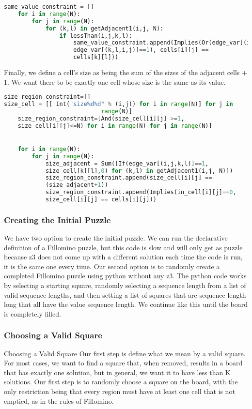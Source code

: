 \begin{lstlisting}[language=python]
  same_value_constraint = []
    for i in range(N):
        for j in range(N):
            for (k,l) in getAdjacent1(i,j, N):
                if lessThan(i,j,k,l):
                    same_value_constraint.append(Implies(Or(edge_var[(i,j,k,l)]==1,
                    edge_var[(k,l,i,j)]==1), cells[i][j] ==
                    cells[k][l]))

\end{lstlisting}

Finally, we define a cell’s size as being the sum of the sizes of the
adjacent cells + 1. We want there to be exactly one cell whose size is
the same as its value.


\begin{lstlisting}[language=python]
size_region_constraint=[]
size_cell = [[ Int("size%d%d" % (i,j)) for i in range(N)] for j in
                            range(N)]
    size_region_constraint=[And(size_cell[i][j] >=1,
    size_cell[i][j]<=N) for i in range(N) for j in range(N)]


    for i in range(N):
        for j in range(N):
            size_adjacent = Sum([If(edge_var[(i,j,k,l)]==1,
            size_cell[k][l],0) for (k,l) in getAdjacent1(i,j, N)])
            size_region_constraint.append(size_cell[i][j] ==
            (size_adjacent+1))
            size_region_constraint.append(Implies(in_cell[i][j]==0,
            size_cell[i][j] == cells[i][j]))
\end{lstlisting}


\subsubsection{Creating the Initial Puzzle}
We have two option to create the initial puzzle. We can run the
declarative definition of a Fillomino puzzle, but this code is slow
and will only get as puzzle because z3 does not come up with a
different solution each time the code is run, it is the same one every
time. Our second option is to randomly create a completed Fillomino
puzzle using python without any z3. The python code works by selecting
a starting square, randomly selecting a sequence length from a list of
valid sequence lengths, and then setting a list of squares that are
sequence length long that all have the value sequence length. We
continue like this until the board is completely filled.



\subsubsection{Choosing a Valid Square}
Choosing a Valid Square
Our first step is define what we mean by a valid square. For most
cases, we want to find a square that, when removed, results in a board
that has exactly one solution, but in general, we want it to have less
than K solutions. Our first step is to randomly choose a square on the
board, with the only restriction being that every region must have at
least one cell that is not emptied, as in the rules of Fillomino. 

